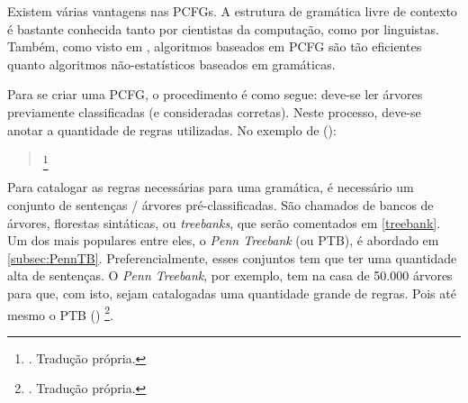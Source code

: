 Existem várias vantagens nas PCFGs. A estrutura de gramática livre de contexto é bastante conhecida tanto por cientistas da computação, como por linguistas. Também, como visto em  \cite[p~38]{charniak97statistical}, algoritmos baseados em PCFG são tão eficientes quanto algoritmos não-estatísticos baseados em gramáticas.

Para se criar uma PCFG, o procedimento é como segue: deve-se ler árvores previamente classificadas (e consideradas corretas). Neste processo, deve-se anotar a quantidade de regras utilizadas. No exemplo de (\textit{}):
\begin{quote}
    \footnote{. Tradução própria.}
\end{quote}
Para catalogar as regras necessárias para uma gramática, é necessário um conjunto de sentenças / árvores pré-classificadas. São chamados de bancos de árvores, florestas sintáticas, ou \textit{treebanks}, que serão comentados em \ref{treebank}. Um dos mais populares entre eles, o \textit{Penn Treebank} (ou PTB), é abordado em \ref{subsec:PennTB}. Preferencialmente, esses conjuntos tem que ter uma quantidade alta de sentenças. O  \textit{Penn Treebank}, por exemplo, tem na casa de 50.000 árvores para que, com isto, sejam catalogadas uma quantidade grande de regras. Pois até mesmo o PTB (\textit{}) \footnote{. Tradução própria.}.

